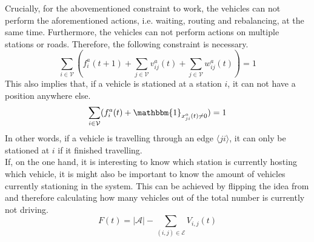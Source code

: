 Crucially, for the abovementioned constraint to work, the vehicles can not perform the aforementioned actions, i.e. waiting, routing and rebalancing, at the same time. Furthermore, the vehicles can not perform actions on multiple stations or roads. Therefore, the following constraint is necessary. \\
\begin{equation}
	\sum_{i \in \mathcal{V}}(f^a_{i}(t+1)+\sum_{j \in \mathcal{V}}v^a_{ij}(t) + \sum_{j \in \mathcal{V}}w^a_{ij}(t)) = 1\label{eq:no_3_actions}
\end{equation}
This also implies that, if a vehicle is stationed at a station $i$, it can not have a position anywhere else. 
\begin{equation}
	\sum_{i \in \mathcal{V}}(f^a_{i}(t)+\mathbbm{1}_{ x^a_{ji}(t)\neq 0}) =1 \label{eq:position_station}
\end{equation}
In other words, if a vehicle is travelling through an edge $\langle ji\rangle$, it can only be stationed at $i$ if it finished travelling. \\
 If, on the one hand, it is interesting to know which station is currently hosting which vehicle, it is might also be important to know the amount of vehicles currently stationing in the system. This can be achieved by flipping the idea from  and therefore calculating how many vehicles out of the total number is currently not driving. 
\begin{equation}
	F(t) = |\mathcal{A}| - \sum_{(i,j) \in \mathcal{E}}V_{i,j}(t)%
\end{equation}


